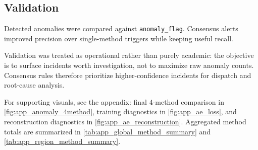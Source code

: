 \subsection{Validation}
Detected anomalies were compared against \texttt{anomaly\_flag}. Consensus alerts improved precision over single-method triggers while keeping useful recall.

Validation was treated as operational rather than purely academic: the objective is to surface incidents worth investigation, not to maximize raw anomaly counts. Consensus rules therefore prioritize higher-confidence incidents for dispatch and root-cause analysis.

For supporting visuals, see the appendix: final 4-method comparison in \autoref{fig:app_anomaly_4method}, training diagnostics in \autoref{fig:app_ae_loss}, and reconstruction diagnostics in \autoref{fig:app_ae_reconstruction}. Aggregated method totals are summarized in \autoref{tab:app_global_method_summary} and \autoref{tab:app_region_method_summary}.